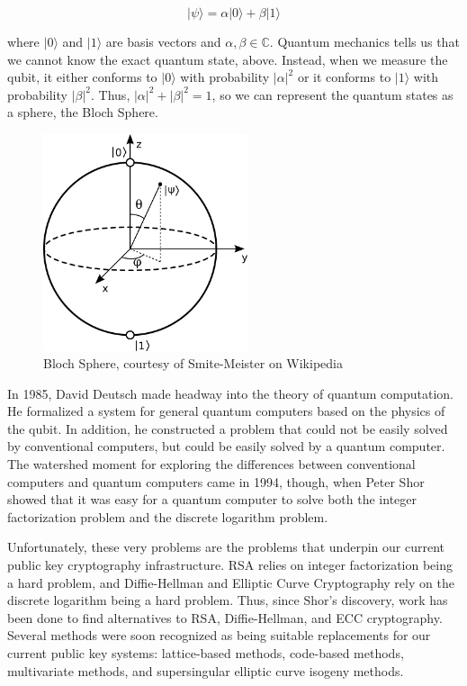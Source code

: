 \documentclass{article}
\begin{document}
$$
| {\psi} \rangle = \alpha | 0 \rangle + \beta | 1 \rangle
$$

where $ | 0 \rangle $ and $ | 1 \rangle $ are basis vectors and $ \alpha, \beta \in \mathbb{C} $. Quantum mechanics tells us that we cannot know the exact quantum state, above. Instead, when we measure the qubit, it either conforms to $ | 0 \rangle $ with probability $ | \alpha |^2 $ or it conforms to $ | 1 \rangle $ with probability $ | \beta |^2 $. Thus, $ | \alpha |^2 + | \beta |^2 = 1 $, so we can represent the quantum states as a sphere, the Bloch Sphere.\cite{nielsen12}

\begin{figure}[h!]
	\centering
	\includegraphics[width=60mm]{bloch_sphere.png}
	\caption{Bloch Sphere, courtesy of Smite-Meister on Wikipedia}
\end{figure}

In 1985, David Deutsch made headway into the theory of quantum computation. He formalized a system for general quantum computers based on the physics of the qubit. In addition, he constructed a problem that could not be easily solved by conventional computers, but could be easily solved by a quantum computer.\cite{nielsen12} The watershed moment for exploring the differences between conventional computers and quantum computers came in 1994, though, when Peter Shor showed that it was easy for a quantum computer to solve both the integer factorization problem and the discrete logarithm problem.\cite{shor95}

Unfortunately, these very problems are the problems that underpin our current public key cryptography infrastructure. RSA relies on integer factorization being a hard problem, and Diffie-Hellman and Elliptic Curve Cryptography rely on the discrete logarithm being a hard problem.\cite{kaufman02} Thus, since Shor's discovery, work has been done to find alternatives to RSA, Diffie-Hellman, and ECC cryptography. Several methods were soon recognized as being suitable replacements for our current public key systems: lattice-based methods, code-based methods, multivariate methods, and supersingular elliptic curve isogeny methods.
\end{document}
